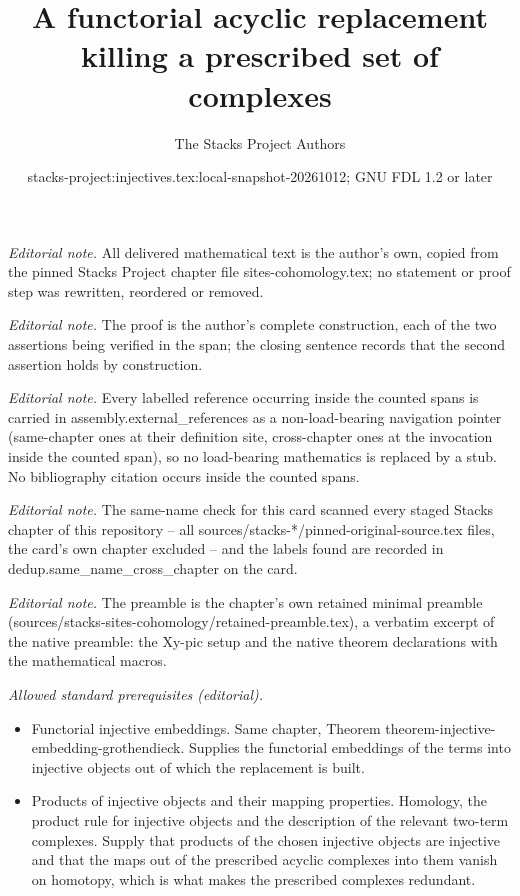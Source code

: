 \documentclass[10pt,a4paper]{amsart}
\title{A functorial acyclic replacement killing a prescribed set of complexes}
\author{The Stacks Project Authors}
\date{stacks-project:injectives.tex:local-snapshot-20261012; GNU FDL 1.2 or later}
\theoremstyle{plain}
\theoremstyle{definition}
\theoremstyle{remark}
\numberwithin{equation}{subsection}
\begin{document}
\maketitle
\noindent\textit{Editorial note.} All delivered mathematical text is the author's own, copied from the pinned Stacks Project chapter file sites-cohomology.tex; no statement or proof step was rewritten, reordered or removed.\par\medskip
\noindent\textit{Editorial note.} The proof is the author's complete construction, each of the two assertions being verified in the span; the closing sentence records that the second assertion holds by construction.\par\medskip
\noindent\textit{Editorial note.} Every labelled reference occurring inside the counted spans is carried in assembly.external\_references as a non-load-bearing navigation pointer (same-chapter ones at their definition site, cross-chapter ones at the invocation inside the counted span), so no load-bearing mathematics is replaced by a stub. No bibliography citation occurs inside the counted spans.\par\medskip
\noindent\textit{Editorial note.} The same-name check for this card scanned every staged Stacks chapter of this repository -- all sources/stacks-*/pinned-original-source.tex files, the card's own chapter excluded -- and the labels found are recorded in dedup.same\_name\_cross\_chapter on the card.\par\medskip
\noindent\textit{Editorial note.} The preamble is the chapter's own retained minimal preamble (sources/stacks-sites-cohomology/retained-preamble.tex), a verbatim excerpt of the native preamble: the Xy-pic setup and the native theorem declarations with the mathematical macros.\par\medskip
\noindent\textit{Allowed standard prerequisites (editorial).}\begin{itemize}
\item Functorial injective embeddings. Same chapter, Theorem theorem-injective-embedding-grothendieck. Supplies the functorial embeddings of the terms into injective objects out of which the replacement is built.
\item Products of injective objects and their mapping properties. Homology, the product rule for injective objects and the description of the relevant two-term complexes. Supply that products of the chosen injective objects are injective and that the maps out of the prescribed acyclic complexes into them vanish on homotopy, which is what makes the prescribed complexes redundant.
\end{itemize}\medskip
\end{document}

